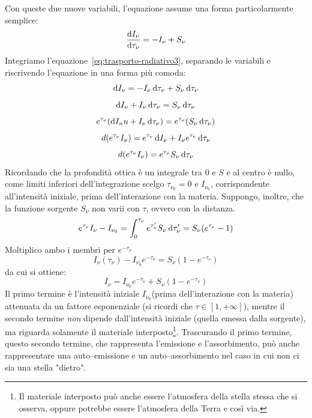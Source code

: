 Con queste due nuove variabili, l'equazione assume una forma particolarmente semplice:
\begin{equation}\label{eq:trasporto-radiativo3}
    \frac{\mathop{\mathrm{{}d}}\mathopen{} I_\nu}{\mathop{\mathrm{{}d}}\mathopen{} \tau_\nu} = -I_\nu + S_\nu
\end{equation}
Integriamo l'equazione~\eqref{eq:trasporto-radiativo3}, separando le variabili e riscrivendo l'equazione in una forma più comoda:
\[
    \mathop{\mathrm{{}d}}\mathopen{} I_\nu = -I_\nu \mathop{\mathrm{{}d}}\mathopen{} \tau_\nu  + S_\nu \mathop{\mathrm{{}d}}\mathopen{} \tau_\nu
\]
\[
    \mathop{\mathrm{{}d}}\mathopen{} I_\nu + I_\nu \mathop{\mathrm{{}d}}\mathopen{} \tau_\nu  = S_\nu \mathop{\mathrm{{}d}}\mathopen{} \tau_\nu
\]
\[
    e^{\tau_\nu} (\mathop{\mathrm{{}d}}\mathopen{} I_nu + I_\nu \mathop{\mathrm{{}d}}\mathopen{} \tau_\nu)  = e^{\tau_\nu} (S_\nu \mathop{\mathrm{{}d}}\mathopen{} \tau_\nu)
\]
\[
    d(e^{\tau_\nu} I_\nu) = e^{\tau_\nu} \mathop{\mathrm{{}d}}\mathopen{} I_\nu + I_\nu e^{\tau_\nu} \mathop{\mathrm{{}d}}\mathopen{} \tau_\nu
\]
\[
    d(e^{\tau_\nu} I_\nu) = e^{\tau_\nu} S_\nu \mathop{\mathrm{{}d}}\mathopen{} \tau_\nu
\]
Ricordando che la profondità ottica è un integrale tra $0$ e $S$ e al centro è nullo, come limiti inferiori dell'integrazione scelgo $\tau_{\nu_0} = 0$ e $I_{\nu_0}$, corrispondente all'intensità iniziale, prima dell'interazione con la materia. Suppongo, inoltre, che la funzione sorgente $S_\nu$ non varii con $\tau$, ovvero con la distanza.
\[
    e^{\tau_\nu} I_\nu - I_{\nu_0} = \int_0^{\tau_\nu} e^{\tau_\nu'} S_\nu \mathop{\mathrm{{}d}}\mathopen{} \tau_\nu' = S_\nu (e^{\tau_\nu} - 1)
\]
Moltiplico ambo i membri per $e^{-\tau_\nu}$
\[
    I_\nu (\tau_\nu) - I_{\nu_0} e^{-\tau_\nu} = S_\nu (1-e^{-\tau_\nu})
\]
da cui si ottiene:
\begin{equation}\label{eq:soluzione-trasporto-radiativo}
    I_\nu = I_{\nu_0} e^{-\tau_\nu} + S_\nu (1- e^{-\tau_\nu})
\end{equation}
Il primo termine è l'intensità iniziale $I_{\nu_0}$(prima dell'interazione con la materia) attenuata da un fattore esponenziale (si ricordi che $\tau \in [1,+\infty]$), mentre il secondo termine \emph{non} dipende dall'intensità iniziale (quella emessa dalla sorgente), ma riguarda solamente il materiale interposto\footnote{Il materiale interposto può anche essere l'atmosfera della stella stessa che si osserva, oppure potrebbe essere l'atmosfera della Terra e così via.}. Trascurando il primo termine, questo secondo termine, che rappresenta l'emissione e l'assorbimento, può anche rappresentare una auto--emissione e un auto--assorbimento nel caso in cui non ci sia una stella "dietro".

